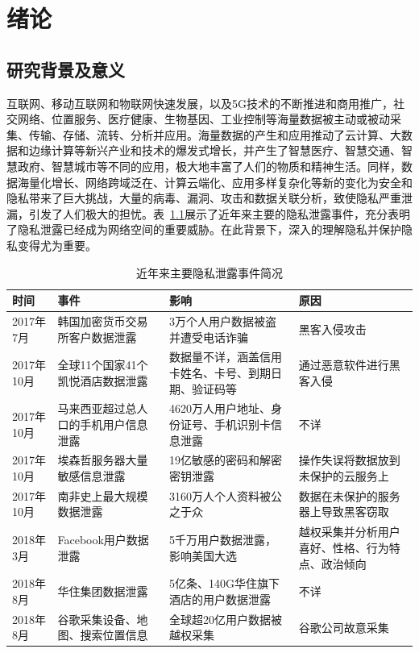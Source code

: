 \chapter{绪论}
\label{chap:intro}

\section{研究背景及意义}
互联网、移动互联网和物联网快速发展，以及5G技术的不断推进和商用推广，社交网络、位置服务、医疗健康、生物基因、工业控制等海量数据被主动或被动采集、传输、存储、流转、分析并应用。海量数据的产生和应用推动了云计算、大数据和边缘计算等新兴产业和技术的爆发式增长，并产生了智慧医疗、智慧交通、智慧政府、智慧城市等不同的应用，极大地丰富了人们的物质和精神生活。同样，数据海量化增长、网络跨域泛在、计算云端化、应用多样复杂化等新的变化为安全和隐私带来了巨大挑战，大量的病毒、漏洞、攻击和数据关联分析，致使隐私严重泄漏，引发了人们极大的担忧。表~\ref{tab:privacy_leakeges}展示了近年来主要的隐私泄露事件，充分表明了隐私泄露已经成为网络空间的重要威胁。在此背景下，深入的理解隐私并保护隐私变得尤为重要。

\begin{table}[htbp]
\caption{近年来主要隐私泄露事件简况}
\label{tab:privacy_leakeges}
\centering
\begin{tabular}{p{}p{}p{}p{}}%

	\toprule
	\textbf{时间}&\textbf{事件}&\textbf{影响}&\textbf{原因}\\
	\midrule
	2017年7月 & 韩国加密货币交易所客户数据泄露 & 3万个人用户数据被盗并遭受电话诈骗 & 黑客入侵攻击\\
	2017年10月 & 全球11个国家41个凯悦酒店数据泄露 & 数据量不详，涵盖信用卡姓名、卡号、到期日期、验证码等 & 通过恶意软件进行黑客入侵\\
	2017年10月 & 马来西亚超过总人口的手机用户信息泄露 &4620万人用户地址、身份证号、手机识别卡信息泄露 & 不详\\
	2017年10月 & 埃森哲服务器大量敏感信息泄露 & 19亿敏感的密码和解密密钥泄露 & 操作失误将数据放到未保护的云服务上\\
	2017年10月 & 南非史上最大规模数据泄露 & 3160万人个人资料被公之于众 & 数据在未保护的服务器上导致黑客窃取\\
	2018年3月 & Facebook用户数据泄露 & 5千万用户数据泄露，影响美国大选 & 越权采集并分析用户喜好、性格、行为特点、政治倾向\\
	2018年8月 & 华住集团数据泄露 & 5亿条、140G华住旗下酒店的用户数据泄露 & 不详\\
	2018年8月 & 谷歌采集设备、地图、搜索位置信息 & 全球超20亿用户数据被越权采集 & 谷歌公司故意采集\\
\bottomrule
\end{tabular}
\end{table}

